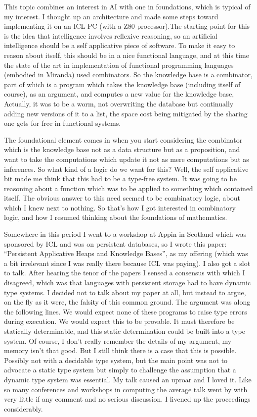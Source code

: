 \documentclass[10pt,titlepage]{book}
\begin{document}
This topic combines an interest in AI with one in foundations, which is typical of my interest.
I thought up an architecture and made some steps toward implementing it on an ICL PC (with a Z80 processor).The starting point for this is the idea that intelligence involves reflexive reasoning, so an artificial intelligence should be a self applicative piece of software.
To make it easy to reason about itself, this should be in a nice functional language, and at this time the state of the art in implementation of functional programming languages (embodied in Miranda) used combinators.
So the knowledge base is a combinator, part of which is a program which takes the knowledge base (including itself of course), as an argument, and computes a new value for the knowledge base,
Actually, it was to be a worm, not overwriting the database but continually adding new versions of it to a list, the space cost being mitigated by the sharing one gets for free in functional systems.

The foundational element comes in when you start considering the combinator which is the knowledge base not as a data structure but as a proposition, and want to take the computations which update it not as mere computations but as inferences.
So what kind of a logic do we want for this?
Well, the self applicative bit made me think that this had to be a type-free system.
It was going to be reasoning about a function which was to be applied to something which contained itself.
The obvious answer to this need seemed to be combinatory logic, about which I knew next to nothing.
So that's how I got interested in combinatory logic, and how I resumed thinking about the foundations of mathematics.

Somewhere in this period I went to a workshop at Appin in Scotland which was sponsored by ICL and was on persistent databases, so I wrote this paper:
``Persistent Applicative Heaps and Knowledge Bases'', as my offering (which was a bit irrelevant since I was really there because ICL was paying).
I also got a slot to talk.
After hearing the tenor of the papers I sensed a consensus with which I disagreed, which was that languages with persistent storage had to have dynamic type systems.
I decided not to talk about my paper at all, but instead to argue, on the fly as it were, the falsity of this common ground.
The argument was along the following lines.
We would expect none of these programs to raise type errors during execution.
We would expect this to be provable.
It must therefore be statically determinable, and this static determination could be built into a type system.
Of course, I don't really remember the details of my argument, my memory isn't that good.
But I still think there is a case that this is possible.
Possibly not with a decidable type system, but the main point was not to advocate a static type system but simply to challenge the assumption that a dynamic type system was essential.
My talk caused an uproar and I loved it.
Like so many conferences and workshops in computing the average talk went by with very little if any comment and no serious discussion.
I livened up the proceedings considerably.
\end{document}

